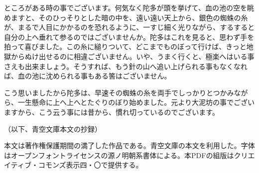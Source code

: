 \documentclass[tate,twocolumn,book,paper=a4]{jlreq}
\begin{document}
ところがある時の事でございます。何気なく陀多が頭を挙げて、血の池の空を眺めますと、そのひっそりとした暗の中を、遠い遠い天上から、銀色の蜘蛛の糸が、まるで人目にかかるのを恐れるように、一すじ細く光りながら、するすると自分の上へ垂れて参るのではございませんか。陀多はこれを見ると、思わず手を拍って喜びました。この糸に縋りついて、どこまでものぼって行けば、きっと地獄からぬけ出せるのに相違ございません。いや、うまく行くと、極楽へはいる事さえも出来ましょう。そうすれば、もう針の山へ追い上げられる事もなくなれば、血の池に沈められる事もある筈はございません。\par
こう思いましたから陀多は、早速その蜘蛛の糸を両手でしっかりとつかみながら、一生懸命に上へ上へとたぐりのぼり始めました。元より大泥坊の事でございますから、こう云う事には昔から、慣れ切っているのでございます。\par
（以下、青空文庫本文の抄録）\par
本文は著作権保護期間の満了した作品である。青空文庫の本文を利用した。字体はオープンフォントライセンスの源ノ明朝系書体による。本PDFの組版はクリエイティブ・コモンズ表示四・〇で提供する。\par
\end{document}

